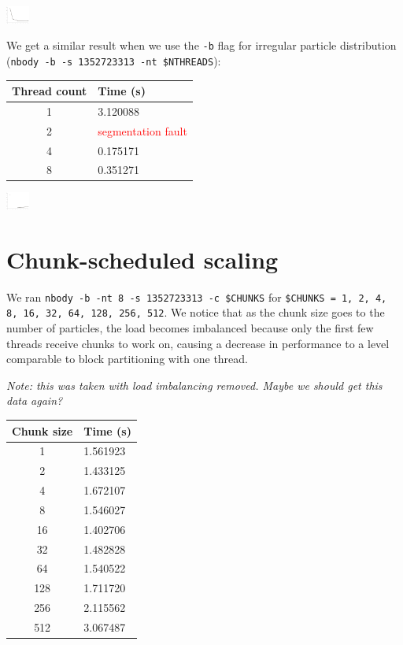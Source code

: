\documentclass{article}[12pt;letterpaper]
\begin{document}
\includegraphics[width=0.3in]{a2_sec1_1.png}

We get a similar result when we use the \texttt{-b} flag for irregular
particle distribution (\texttt{nbody -b -s 1352723313 -nt \$NTHREADS}):

\begin{tabular}{c l}
Thread count & Time (s) \\
\hline{}
1 & 3.120088 \\
2 & \textcolor{red}{segmentation fault} \\ %
4 & 0.175171 \\
8 & 0.351271
\end{tabular}

\includegraphics[width=0.3in]{a2_sec1_2.png}

\section{Chunk-scheduled scaling}

We ran \texttt{nbody -b -nt 8 -s 1352723313 -c \$CHUNKS} for \texttt{\$CHUNKS =
1, 2, 4, 8, 16, 32, 64, 128, 256, 512}. We notice that as the chunk size goes
to the number of particles, the load becomes imbalanced because only the first
few threads receive chunks to work on, causing a decrease in performance to a
level comparable to block partitioning with one thread.

\textit{Note: this was taken with load imbalancing removed. Maybe we should
get this data again?}

\begin{tabular}{c l}
Chunk size & Time (s) \\
\hline{}
  1 & 1.561923 \\
  2 & 1.433125 \\
  4 & 1.672107 \\
  8 & 1.546027 \\
 16 & 1.402706 \\
 32 & 1.482828 \\
 64 & 1.540522 \\
128 & 1.711720 \\
256 & 2.115562 \\
512 & 3.067487
\end{tabular}
\end{document}
